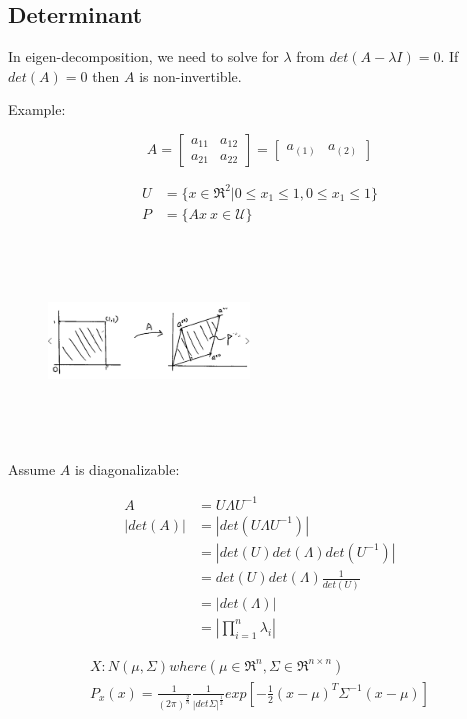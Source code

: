 \subsection{Determinant}

In eigen-decomposition, we need to solve for $\lambda$ from $det(A - \lambda I) = 0$. 
If $det(A) = 0$ then $A$ is non-invertible. 

Example:

$$A = 
\left[
\begin{matrix}
a_{11} & a_{12}\\
a_{21} & a_{22}
\end{matrix}
\right] =
\left[
\begin{matrix}
a_{(1)} & a_{(2)}
\end{matrix}
\right]
$$

\begin{align*}
U &= \{x\in \Re^2 | 0\leq x_1 \leq 1, 0\leq x_1 \leq 1 \}\\
P &= \{Ax \ x\in \mathcal{U}\} 
\end{align*}

\begin{figure}
	\centering
	\includegraphics[width=2.1in,height=2.1in]{figures/ch03/figure1.jpg}
\end{figure}

Assume $A$ is diagonalizable:

\begin{align*}
A &= U\Lambda U^{-1}\\
|det(A)| &= |det(U\Lambda U^{-1})| \\
&= |det(U)det(\Lambda)det(U^{-1})|\\
&= det(U)det(\Lambda)\frac{1}{det(U)}\\
&= |det(\Lambda)|\\
&= |\prod^n_{i=1}\lambda_i|
\end{align*}

\begin{align*}
X: N(\mu, \Sigma)where(\mu \in \Re^n, \Sigma \in \Re^{n\times n})\\
P_x(x) = \frac{1}{(2\pi)^{\frac{2}{n}}}\frac{1}{|det\Sigma|^{\frac{1}{2}}}exp[-\frac{1}{2}(x - \mu)^T\Sigma^{-1}(x - \mu)]
\end{align*}

